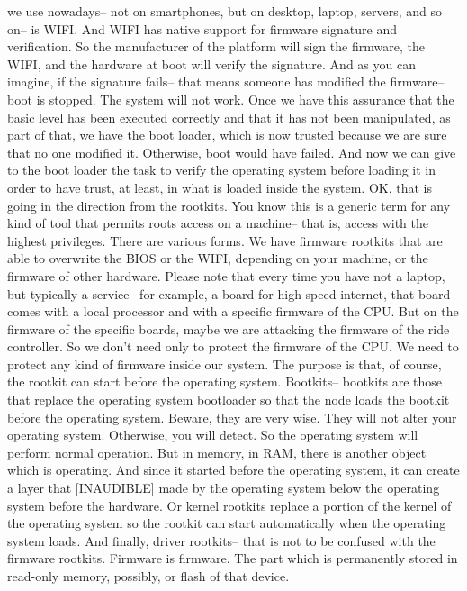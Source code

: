  we use nowadays-- not on smartphones, but on desktop, laptop, servers, and so
 on-- is WIFI. And WIFI has native support for firmware signature and
 verification. So the manufacturer of the platform will sign the firmware, the
 WIFI, and the hardware at boot will verify the signature. And as you can
 imagine, if the signature fails-- that means someone has modified the
 firmware-- boot is stopped. The system will not work. Once we have this
 assurance that the basic level has been executed correctly and that it has not
 been manipulated, as part of that, we have the boot loader, which is now
 trusted because we are sure that no one modified it. Otherwise, boot would
 have failed. And now we can give to the boot loader the task to verify the
 operating system before loading it in order to have trust, at least, in what
 is loaded inside the system. OK, that is going in the direction from the
 rootkits. You know this is a generic term for any kind of tool that permits
 roots access on a machine-- that is, access with the highest privileges. There
 are various forms. We have firmware rootkits that are able to overwrite the
 BIOS or the WIFI, depending on your machine, or the firmware of other
 hardware. Please note that every time you have not a laptop, but typically a
 service-- for example, a board for high-speed internet, that board comes with
 a local processor and with a specific firmware of the CPU. But on the firmware
 of the specific boards, maybe we are attacking the firmware of the ride
 controller. So we don't need only to protect the firmware of the CPU. We need
 to protect any kind of firmware inside our system. The purpose is that, of
 course, the rootkit can start before the operating system. Bootkits-- bootkits
 are those that replace the operating system bootloader so that the node loads
 the bootkit before the operating system. Beware, they are very wise. They will
 not alter your operating system. Otherwise, you will detect. So the operating
 system will perform normal operation. But in memory, in RAM, there is another
 object which is operating. And since it started before the operating system,
 it can create a layer that [INAUDIBLE] made by the operating system below the
 operating system before the hardware. Or kernel rootkits replace a portion of
 the kernel of the operating system so the rootkit can start automatically when
 the operating system loads. And finally, driver rootkits-- that is not to be
 confused with the firmware rootkits. Firmware is firmware. The part which is
 permanently stored in read-only memory, possibly, or flash of that device.
